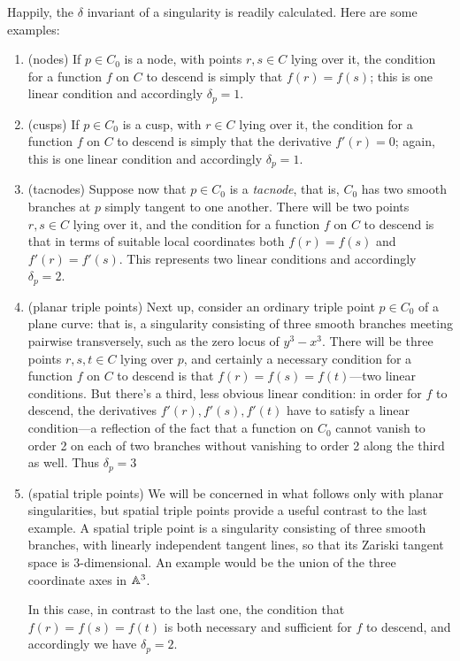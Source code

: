 Happily, the $\delta$ invariant of a singularity is readily calculated. Here are some examples:
\begin{enumerate}

\item (nodes) If $p \in C_0$ is a node, with points $r,s \in C$ lying over it, the condition for a function $f$ on $C$ to descend is simply that $f(r)=f(s)$; this is one linear condition and accordingly $\delta_p = 1$.

\item (cusps) If $p \in C_0$ is a cusp, with  $r \in C$ lying over it, the condition for a function $f$ on $C$ to descend is simply that the derivative $f'(r)=0$; again, this is one linear condition and accordingly $\delta_p = 1$.

\item (tacnodes) Suppose now that $p \in C_0$ is a \emph{tacnode}, that is, $C_0$ has two smooth branches at $p$ simply tangent to one another. There will be two points $r, s \in C$ lying over it, and the condition for a function $f$ on $C$ to descend is that in terms of suitable local coordinates both $f(r)=f(s)$ and $f'(r)=f'(s)$.  This represents two linear conditions and accordingly $\delta_p = 2$.

\item (planar triple points) Next up, consider an ordinary triple point $p \in C_0$ of a plane curve: that is, a singularity consisting of three smooth branches meeting pairwise transversely, such as the zero locus of $y^3-x^3$. There will be three points $r,s,t \in C$ lying over $p$, and certainly a necessary condition for a function $f$ on $C$ to descend is that $f(r)=f(s)=f(t)$---two linear conditions. But there's a third, less obvious linear condition: in order for $f$ to descend, the derivatives $f'(r), f'(s), f'(t)$ have to satisfy a linear condition---a reflection of the fact that a function on $C_0$ cannot vanish to order 2 on each of two branches without vanishing to order 2 along the third as well. Thus $\delta_p = 3$

\item (spatial triple points) We will be concerned in what follows only with planar singularities, but spatial triple points provide a useful contrast to the last example. A spatial triple point is a singularity consisting of three smooth branches, with linearly independent tangent lines, so that its Zariski tangent space is 3-dimensional. An example would be the union of the three coordinate axes in $\AA^3$.

In this case, in contrast to the last one, the condition that $f(r)=f(s)=f(t)$ is both necessary and sufficient for $f$ to descend, and accordingly we have $\delta_p=2$.

\end{enumerate}


